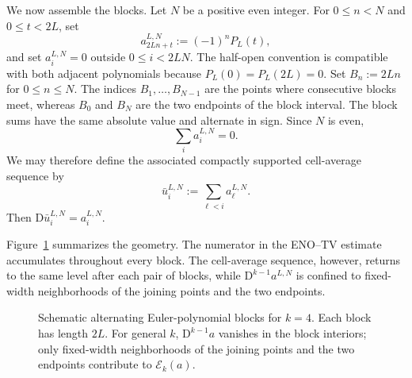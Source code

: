 \documentclass[11pt]{amsart}
\theoremstyle{plain}
\theoremstyle{definition}
\theoremstyle{remark}
\numberwithin{equation}{section}
\theoremstyle{plain}
\begin{document}
We now assemble the blocks.  Let $N$ be a positive even integer.  For
$0\le n<N$ and $0\le t<2L$, set
\begin{equation}\label{eq:euler-block-definition}
	a_{2Ln+t}^{L,N}:=(-1)^nP_L(t),
\end{equation}
and set $a_i^{L,N}=0$ outside $0\le i<2LN$.  The half-open convention is
compatible with both adjacent polynomials because $P_L(0)=P_L(2L)=0$.
Set $B_n:=2Ln$ for $0\le n\le N$.  The indices
$B_1,\ldots,B_{N-1}$ are the points where consecutive blocks meet, whereas
$B_0$ and $B_N$ are the two endpoints of the block interval.
The block sums have the same absolute value and alternate in sign.  Since $N$ is even,
\begin{equation}\label{eq:euler-block-zero-sum}
	\sum_i a_i^{L,N}=0.
\end{equation}
We may therefore define the associated compactly supported cell-average
sequence by
\begin{equation}\label{eq:euler-block-primitive}
	\bar u_i^{L,N}:=\sum_{\ell<i}a_\ell^{L,N}.
\end{equation}
Then $\mathrm D\bar u_i^{L,N}=a_i^{L,N}$.

Figure~\ref{fig:euler-blocks} summarizes the geometry.  The numerator in
the ENO--TV estimate accumulates throughout every block.  The cell-average
sequence, however, returns to the same level after each pair of blocks, while
$\mathrm D^{k-1}a^{L,N}$ is confined to fixed-width neighborhoods of the
joining points and the two endpoints.

\begin{figure}[htbp]
	\centering
	\caption{Schematic alternating Euler-polynomial blocks for $k=4$.
		Each block has length $2L$.  For general $k$,
		$\mathrm D^{k-1}a$ vanishes in the block interiors; only fixed-width
		neighborhoods of the joining points and the two endpoints
		contribute to $\mathcal E_k(a)$.}
	\label{fig:euler-blocks}
\end{figure}
\end{document}
